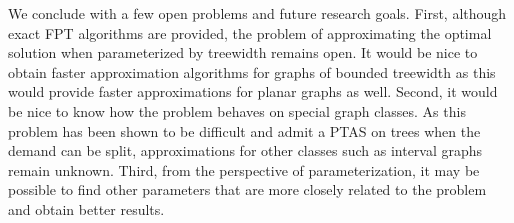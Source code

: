 \documentclass[a4paper,11pt]{article}
\theoremstyle{definition}
\begin{document}
We conclude with a few open problems and future research goals. First, although exact FPT algorithms are provided, the problem of approximating the optimal solution when parameterized by treewidth remains open. It would be nice to obtain faster approximation algorithms for graphs of bounded treewidth as this would provide faster approximations for planar graphs as well. Second, it would be nice to know how the problem behaves on special graph classes. As this problem has been shown to be difficult and admit a PTAS on trees when the demand can be split, approximations for other classes such as interval graphs remain unknown. Third, from the perspective of parameterization, it may be possible to find other parameters that are more closely related to the problem and obtain better results.





\small

\end{document}
